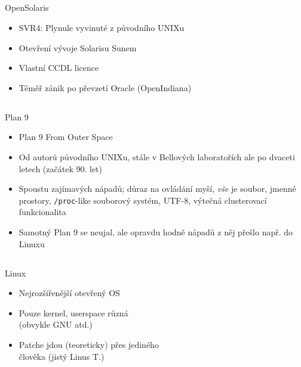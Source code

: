 \documentclass{beamer}
\begin{document}
\subsection{}
\begin{frame}{OpenSolaris}
\begin{itemize}
\item SVR4: Plynule vyvinuté z původního UNIXu
\item Otevření vývoje Solarisu Sunem
\item Vlastní CCDL licence
\item Téměř zánik po převzetí Oracle (OpenIndiana)
\end{itemize}
\end{frame}

\subsection{}
\begin{frame}{Plan 9}
\begin{itemize}
\item Plan 9 From Outer Space
\item Od autorů původního UNIXu, stále v Bellových laboratořích ale po dvaceti letech (začátek 90. let)
\item Spoustu zajímavých nápadů; důraz na ovládání myší, {\em vše} je soubor, jmenné prostory, {\tt /proc}-like souborový systém, UTF-8, výtečná clusterovací funkcionalita
\item Samotný Plan 9 se neujal, ale opravdu hodně nápadů z něj přešlo např. do Linuxu
\end{itemize}
\end{frame}

\subsection{}
\begin{frame}{Linux}
\begin{itemize}
\item Nejrozšířenější otevřený OS
\item Pouze kernel, userspace různá \\ (obvykle GNU atd.)
\item Patche jdou (teoreticky) přes jediného \\ člověka (jistý Linus T.)
\end{itemize}
\end{frame}
\end{document}
